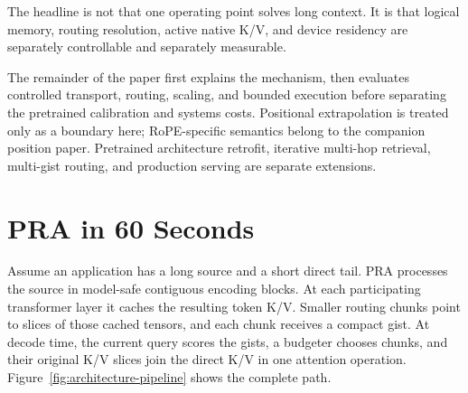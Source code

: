 \documentclass[11pt]{article}
\begin{document}
The headline is not that one operating point solves long context. It is that logical memory,
routing resolution, active native K/V, and device residency are separately controllable and
separately measurable.

The remainder of the paper first explains the mechanism, then evaluates controlled
transport, routing, scaling, and bounded execution before separating the pretrained
calibration and systems costs. Positional extrapolation is treated only as a boundary here;
RoPE-specific semantics belong to the companion position paper. Pretrained architecture
retrofit, iterative multi-hop retrieval, multi-gist routing, and production serving are
separate extensions.

\section{PRA in 60 Seconds}
\label{sec:sixty-seconds}

Assume an application has a long source and a short direct tail. PRA processes the source
in model-safe contiguous encoding blocks. At each participating transformer layer it
caches the resulting token K/V. Smaller routing chunks point to slices of those cached
tensors, and each chunk receives a compact gist. At decode time, the current query scores
the gists, a budgeter chooses chunks, and their original K/V slices join the direct K/V in
one attention operation. Figure~\ref{fig:architecture-pipeline} shows the complete path.
\end{document}
